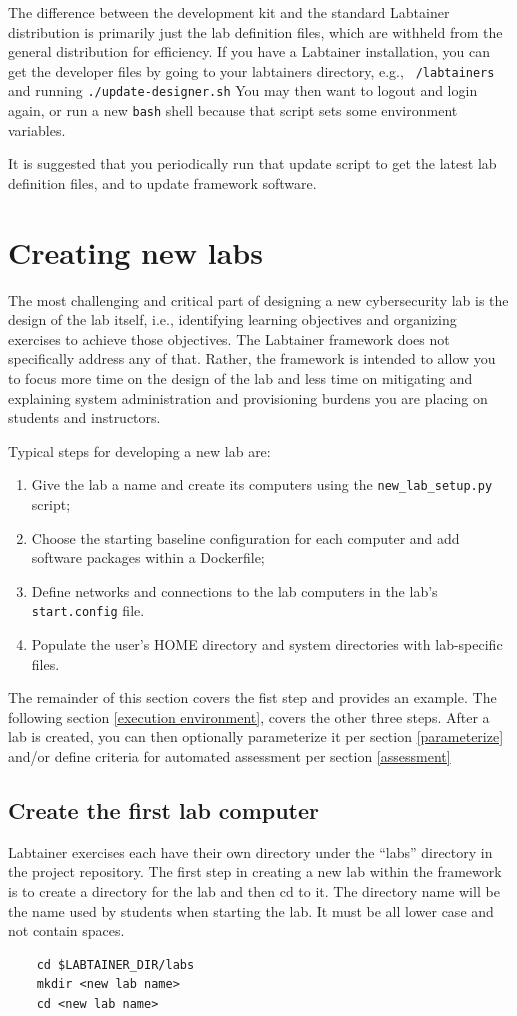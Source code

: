 \documentclass[12pt]{article}
\begin{document}
The difference between the development kit and the standard Labtainer distribution is primarily
just the lab definition files, which are withheld from the general distribution for efficiency.
If you have a Labtainer installation, you can get the developer files by going to your
labtainers directory, e.g., {\tt ~/labtainers} and running {\tt ./update-designer.sh}
You may then want to logout and login again, or run a new {\tt bash} shell because that script
sets some environment variables.

It is suggested that you periodically run that update script to get the latest lab definition files,
and to update framework software.   

\section {Creating new labs}
\label{sec:new_labs}
The most challenging and critical part of designing a new cybersecurity lab
is the design of the lab itself, i.e., identifying learning objectives and
organizing exercises to achieve those objectives.  The Labtainer framework
does not specifically address any of that.  Rather, the framework is intended
to allow you to focus more time on the design of the lab and less time on mitigating and
explaining system administration and provisioning burdens you are placing on 
students and instructors.

Typical steps for developing a new lab are:
\begin{enumerate}
\item Give the lab a name and create its computers using the {\tt new\_lab\_setup.py} script;
\item Choose the starting baseline configuration for each computer and add software packages
within a Dockerfile;
\item Define networks and connections to the lab computers in the lab's {\tt start.config} file.
\item Populate the user's HOME directory and system directories with lab-specific files.
\end{enumerate}
The remainder of this section covers the fist step and provides an example.  The 
following section \ref{execution environment}, covers the other three
steps.  After a lab is created, you can then optionally parameterize it per section \ref{parameterize} and/or
define criteria for automated assessment per section \ref{assessment}

\subsection{Create the first lab computer}
Labtainer exercises each have their own
directory under the ``labs'' directory in the project repository.
The first step in creating a new lab within the framework is to create
a directory for the lab and then cd to it.  The directory name will be the name
used by students when starting the lab.  It must be all lower case and not contain spaces.
\begin{verbatim}
    cd $LABTAINER_DIR/labs
    mkdir <new lab name>
    cd <new lab name>
\end{verbatim}
\end{document}
